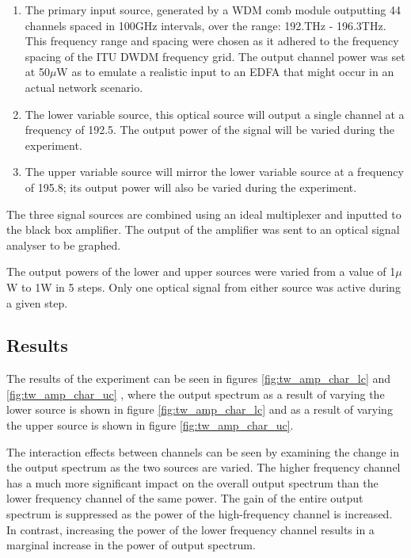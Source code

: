 \begin{enumerate}
    \item The primary input source, generated by a WDM comb module outputting 44 channels spaced in 100GHz intervals, over the range: 192.THz - 196.3THz. This frequency range and spacing were chosen as it adhered to the frequency spacing of the ITU DWDM frequency grid. The output channel power was set at 50$\mu$W as to emulate a realistic input to an EDFA that might occur in an actual network scenario. \\
    
    \item The lower variable source, this optical source will output a single channel at a frequency of 192.5. The output power of the signal will be varied during the experiment.\\
    
    \item The upper variable source will mirror the lower variable source at a frequency of 195.8; its output power will also be varied during the experiment.  
\end{enumerate}


The three signal sources are combined using an ideal multiplexer and inputted to the black box amplifier. The output of the amplifier was sent to an optical signal analyser to be graphed.

The output powers of the lower and upper sources were varied from a value of 1$\mu$W to 1W in 5 steps. Only one optical signal from either source was active during a given step.



\subsection{Results}

The results of the experiment can be seen in figures \ref{fig:tw_amp_char_lc} and \ref{fig:tw_amp_char_uc} , where the output spectrum as a result of varying the lower source is shown in figure \ref{fig:tw_amp_char_lc} and as a result of varying the upper source is shown in figure \ref{fig:tw_amp_char_uc}. 

The interaction effects between channels can be seen by examining the change in the output spectrum as the two sources are varied. The higher frequency channel has a much more significant impact on the overall output spectrum than the lower frequency channel of the same power. The gain of the entire output spectrum is suppressed as the power of the high-frequency channel is increased. In contrast, increasing the power of the lower frequency channel results in a marginal increase in the power of output spectrum. 


